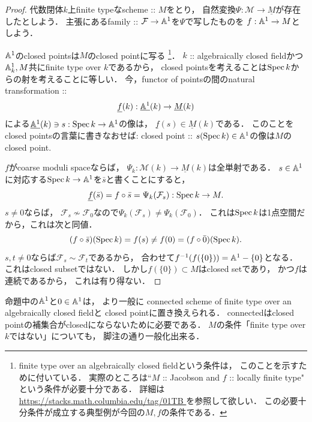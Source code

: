 \documentclass[a4paper]{jsarticle}
\newcommand{\famF}{\mathcal{F}}
\newcommand{\ftor}[1]{\underline{#1}}
\newcommand{\ftorM}{\mathcal{M}}
\begin{document}
    \begin{proof}
        代数閉体$k$上finite typeなscheme :: $M$をとり，
        自然変換$\Psi: \ftorM \to \ftor{M}$が存在したとしよう．
        主張にあるfamily :: $\famF \to \affine^1$を$\Psi$で写したものを
        $f: \mathbb{A}^1 \to M$としよう．

        $\mathbb{A}^1$のclosed pointsは$M$のclosed pointに写る
        \footnote
        {
            finite type over an algebraically closed fieldという条件は，
            このことを示すために付いている．
            実際のところは``$M$ :: Jacobson and $f$ :: locally finite type"
            という条件が必要十分である．
            詳細は\url{ https://stacks.math.columbia.edu/tag/01TB }を参照して欲しい．
            この必要十分条件が成立する典型例が今回の$M,f$の条件である．
        }．
        $k$ :: algebraically closed fieldかつ
        $\mathbb{A}_k^1, M$共にfinite type over $k$であるから，
        closed pointsを考えることは$\operatorname{Spec} k$からの射を考えることに等しい．
        今，functor of pointsの間のnatural transformation :: 
        \[ \ftor{f}(k): \ftor{\affine^1}(k) \to \ftor{M}(k) \]
        による$\ftor{\affine^1}(k) \ni s: \Spec k \to \affine^1$の像は，
        $\ftor{f}(s) \in \ftor{M}(k)$である．
        このことをclosed pointsの言葉に書きなおせば:
        closed point :: $s(\operatorname{Spec} k) \in \mathbb{A}^1$の像は$M$のclosed point.
        
        $f$がcoarse moduli spaceならば，
        $\Psi_k: \ftorM(k) \to \ftor{M}(k)$は全単射である．
        $s \in \mathbb{A}^1$に対応する$\operatorname{Spec} k \to \mathbb{A}^1$を$\bar{s}$と書くことにすると，
        \[ \ftor{f}(\bar{s})=f \circ \bar{s}=\Psi_k(\famF_s): \Spec k \to M. \]
        $s \neq 0$ならば，
        $\famF_s \not \sim \famF_0$なので$\Psi_k(\famF_s) \neq \Psi_k(\famF_0)$．
        これは$\operatorname{Spec} k$は1点空間だから，これは次と同値．
        \[ (f \circ \bar{s})(\operatorname{Spec} k)=f(s) \neq f(0)=(f \circ \bar{0})(\operatorname{Spec} k). \]
        $s, t \neq 0$ならば$\famF_s \sim \famF_t$であるから，
        合わせて$f^{-1}(f(\{0\}))=\mathbb{A}^1-\{0\}$となる．
        これはclosed subsetではない．
        しかし$f(\{0\}) \subset M$はclosed setであり，
        かつ$f$は連続であるから，
        これは有り得ない．
    \end{proof}
    \begin{Remark}
        命題中の$\mathbb{A}^1$と$0 \in \mathbb{A}^1$は，
        より一般に
        connected scheme of finite type over an algebraically closed fieldと
        closed pointに置き換えられる．
        connectedはclosed pointの補集合がclosedにならないために必要である．
        $M$の条件「finite type over $k$ではない」についても，
        脚注の通り一般化出来る．
    \end{Remark}
\end{document}

